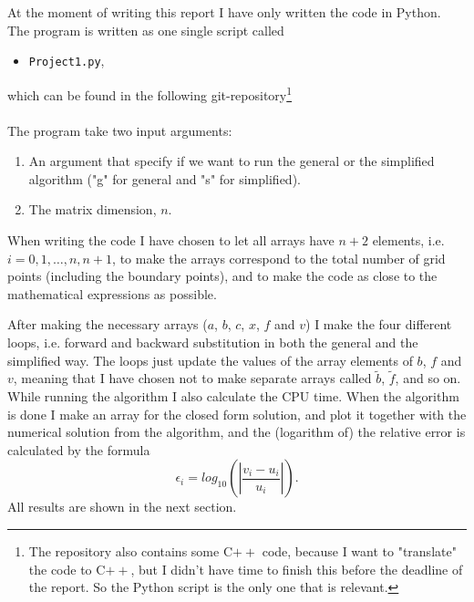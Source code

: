 \documentclass[12pt, a4paper]{article}
\begin{document}
At the moment of writing this report I have only written the code in Python. The program is written as 
one single script called 
\begin{itemize}
\item \texttt{Project1.py}, 
\end{itemize}
which can be found in the following git-repository\footnote{The repository also contains some C$++$ code,  
because I want to "translate" the code to C$++$, but I didn't have time to finish this before the 
deadline of the report. So the Python script is the only one that is relevant.} \vspace{0.5cm} \\ 
 \vspace{0.5cm} \\ 
The program take two input arguments: 
\begin{enumerate}
\item An argument that specify if we want to run the general or the simplified algorithm ("g" for 
general and "s" for simplified). 
\item The matrix dimension, $n$. 
\end{enumerate}  

When writing the code I have chosen to let all arrays have $n+2$ elements, i.e. $i = 0,1,\dots,n,n+1$, to 
make the arrays correspond to the total number of grid points (including the boundary points), and 
to make the code as close to the mathematical expressions as possible.

After making the necessary arrays ($a$, $b$, $c$, $x$, $f$ and $v$) I make the four different loops, i.e. 
forward and backward substitution in both the general and the simplified way. The loops just update the 
values of the array elements of $b$, $f$ and $v$, meaning that I have chosen not to make separate arrays 
called $\tilde{b}$, $\tilde{f}$, and so on. While running the algorithm I also calculate the CPU time. 
When the algorithm is done I make an array for the closed form solution, and plot it together with the 
numerical solution from the algorithm, and the (logarithm of) the relative error is calculated by the
formula
\begin{equation}
\epsilon_i = log_{10}\left(\left| \frac{v_i - u_i}{u_i} \right| \right). 
\label{eq:error}
\end{equation}
All results are shown in the next section. 
   
\end{document}
